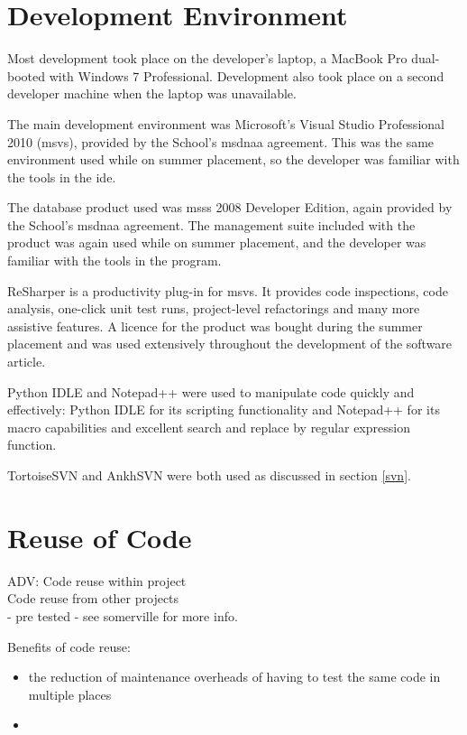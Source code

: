 \documentclass{l4proj}
\begin{document}
\section{Development Environment}
\label{deveEnv}
Most development took place on the developer's laptop, a MacBook Pro dual-booted with Windows 7 Professional.  Development also took place on a second developer machine when the laptop was unavailable.

The main development environment was Microsoft's Visual Studio Professional 2010 (\gls{msvs}), provided by the School's \gls{msdnaa} agreement.  This was the same environment used while on summer placement, so the developer was familiar with the tools in the \gls{ide}.

The database product used was \gls{msss} 2008 Developer Edition, again provided by the School's \gls{msdnaa} agreement. The management suite included with the product was again used while on summer placement, and the developer was familiar with the tools in the program.

ReSharper is a productivity plug-in for \gls{msvs}.  It provides code inspections, code analysis, one-click unit test runs, project-level refactorings and many more assistive features. A licence for the product was bought during the summer placement and was used extensively throughout the development of the software article.

Python IDLE and Notepad++ were used to manipulate code quickly and effectively: Python IDLE for its scripting functionality and Notepad++ for its macro capabilities and excellent search and replace by regular expression function.

TortoiseSVN and AnkhSVN were both used as discussed in section \ref{svn}.

\section{Reuse of Code}
\label{codeReuse}
ADV:
Code reuse within project \\
Code reuse from other projects \\
 - pre tested
 - see somerville for more info.

Benefits of code reuse:
\begin{itemize}
	\item the reduction of maintenance overheads of having to test the same code in multiple places
	\item 
\end{itemize} 
\end{document}
